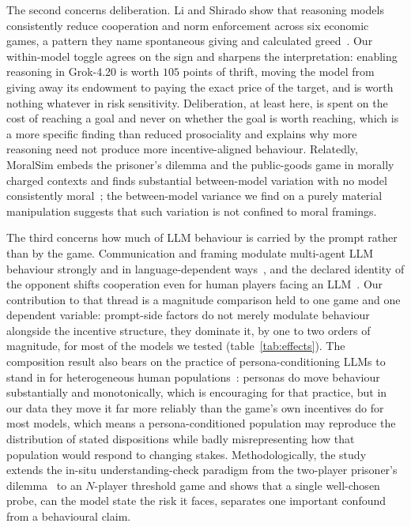 \documentclass[openacc]{rsproca_new}
\begin{document}
The second concerns deliberation. Li and Shirado show that reasoning models consistently reduce cooperation and norm enforcement across six economic games, a pattern they name spontaneous giving and calculated greed~\cite{li2025spontaneous}. Our within-model toggle agrees on the sign and sharpens the interpretation: enabling reasoning in Grok-4.20 is worth $105$ points of thrift, moving the model from giving away its endowment to paying the exact price of the target, and is worth nothing whatever in risk sensitivity. Deliberation, at least here, is spent on the cost of reaching a goal and never on whether the goal is worth reaching, which is a more specific finding than reduced prosociality and explains why more reasoning need not produce more incentive-aligned behaviour. Relatedly, MoralSim embeds the prisoner's dilemma and the public-goods game in morally charged contexts and finds substantial between-model variation with no model consistently moral~\cite{backmann2025ethics}; the between-model variance we find on a purely material manipulation suggests that such variation is not confined to moral framings.

The third concerns how much of LLM behaviour is carried by the prompt rather than by the game. Communication and framing modulate multi-agent LLM behaviour strongly and in language-dependent ways~\cite{buscemi2025strategic,madmoun2025communication}, and the declared identity of the opponent shifts cooperation even for human players facing an LLM~\cite{jiang2025trust}. Our contribution to that thread is a magnitude comparison held to one game and one dependent variable: prompt-side factors do not merely modulate behaviour alongside the incentive structure, they dominate it, by one to two orders of magnitude, for most of the models we tested (table~\ref{tab:effects}). The composition result also bears on the practice of persona-conditioning LLMs to stand in for heterogeneous human populations~\cite{argyle2023out,aher2023using}: personas do move behaviour substantially and monotonically, which is encouraging for that practice, but in our data they move it far more reliably than the game's own incentives do for most models, which means a persona-conditioned population may reproduce the distribution of stated dispositions while badly misrepresenting how that population would respond to changing stakes. Methodologically, the study extends the in-situ understanding-check paradigm from the two-player prisoner's dilemma~\cite{fontana2024nicer} to an $N$-player threshold game and shows that a single well-chosen probe, can the model state the risk it faces, separates one important confound from a behavioural claim.
\end{document}
